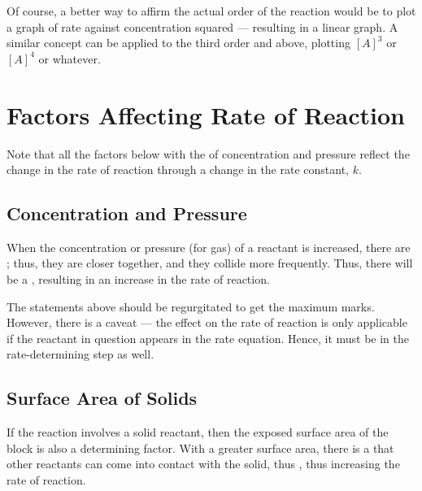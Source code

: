 				Of course, a better way to affirm the actual order of the reaction would be to plot a graph of rate against concentration
				squared --- resulting in a linear graph. A similar concept can be applied to the third order and above, plotting
				$[A]^{3}$ or $[A]^{4}$ or whatever.








	\section{Factors Affecting Rate of Reaction}

		Note that all the factors below with the  of concentration and pressure reflect the change in the rate of reaction
		through a change in the rate constant, $k$.

		\subsection{Concentration and Pressure}

			When the concentration or pressure (for gas) of a reactant is increased, there are ; thus, they are closer together, and they collide more frequently. Thus, there will be a
			, resulting in an increase in the rate of reaction.

			The statements above should be regurgitated to get the maximum marks. However, there is a caveat --- the effect on the rate of
			reaction is only applicable if the reactant in question appears in the rate equation. Hence, it must be in the rate-determining
			step as well.


		\subsection{Surface Area of Solids}

			If the reaction involves a solid reactant, then the exposed surface area of the block is also a determining factor. With a
			greater surface area, there is a  that other reactants can come into contact with the solid, thus
			, thus increasing the rate of reaction.

